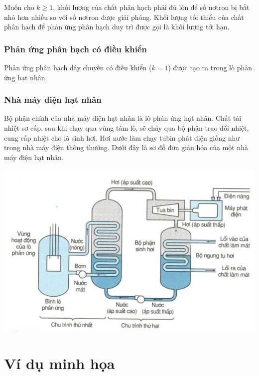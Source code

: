 	Muốn cho $k \geq 1$, khối lượng của chất phân hạch phải đủ lớn để số nơtron bị bắt nhỏ hơn nhiều so với số nơtron được giải phóng. Khối lượng tối thiểu của chất phân hạch để phản ứng phân hạch duy trì được gọi là khối lượng tới hạn.
	
	\subsubsection{Phản ứng phân hạch có điều khiển}
	Phản ứng phân hạch dây chuyền có điều khiển ($k=1$) được tạo ra trong lò phản ứng hạt nhân.
	
	\subsubsection{Nhà máy điện hạt nhân}
	Bộ phận chính của nhà máy điện hạt nhân là lò phản ứng hạt nhân. Chất tải nhiệt sơ cấp, sau khi chạy qua vùng tâm lò, sẽ chảy qua bộ phận trao đổi nhiệt, cung cấp nhiệt cho lò sinh hơi. Hơi nước làm chạy tubin phát điện giống như trong nhà máy điện thông thường. Dưới đây là sơ đồ đơn giản hóa của một nhà máy điện hạt nhân.
	\begin{center}
		\includegraphics[scale=0.8]{../figs/VN12-PH-49-A-027-1-H1.jpg}
	\end{center}

\section{Ví dụ minh họa}



